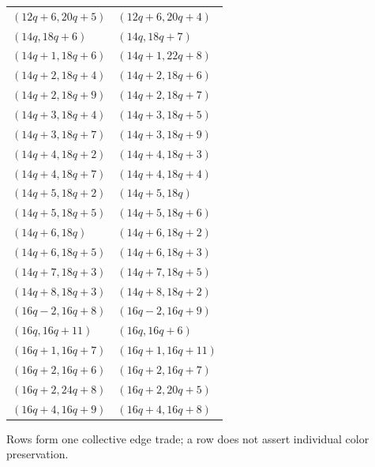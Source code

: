 \begin{longtable}{ll}
$(12q+6,20q+5)$ & $(12q+6,20q+4)$\\
$(14q,18q+6)$ & $(14q,18q+7)$\\
$(14q+1,18q+6)$ & $(14q+1,22q+8)$\\
$(14q+2,18q+4)$ & $(14q+2,18q+6)$\\
$(14q+2,18q+9)$ & $(14q+2,18q+7)$\\
$(14q+3,18q+4)$ & $(14q+3,18q+5)$\\
$(14q+3,18q+7)$ & $(14q+3,18q+9)$\\
$(14q+4,18q+2)$ & $(14q+4,18q+3)$\\
$(14q+4,18q+7)$ & $(14q+4,18q+4)$\\
$(14q+5,18q+2)$ & $(14q+5,18q)$\\
$(14q+5,18q+5)$ & $(14q+5,18q+6)$\\
$(14q+6,18q)$ & $(14q+6,18q+2)$\\
$(14q+6,18q+5)$ & $(14q+6,18q+3)$\\
$(14q+7,18q+3)$ & $(14q+7,18q+5)$\\
$(14q+8,18q+3)$ & $(14q+8,18q+2)$\\
$(16q-2,16q+8)$ & $(16q-2,16q+9)$\\
$(16q,16q+11)$ & $(16q,16q+6)$\\
$(16q+1,16q+7)$ & $(16q+1,16q+11)$\\
$(16q+2,16q+6)$ & $(16q+2,16q+7)$\\
$(16q+2,24q+8)$ & $(16q+2,20q+5)$\\
$(16q+4,16q+9)$ & $(16q+4,16q+8)$\\
\end{longtable}
Rows form one collective edge trade; a row does not assert individual color preservation.
